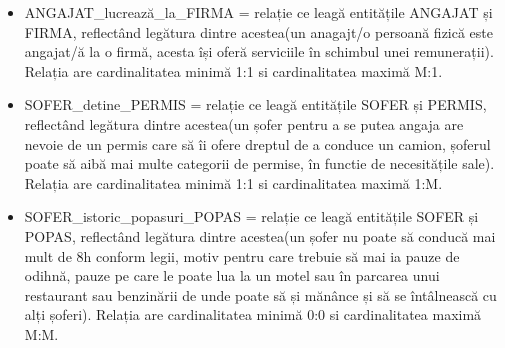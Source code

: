 \documentclass[12pt, a4paper]{article}
\begin{document}
\begin{itemize}
    \item ANGAJAT\_lucrează\_la\_FIRMA = relație ce leagă entitățile ANGAJAT și FIRMA, reflectând legătura dintre acestea(un anagajt/o persoană fizică este angajat/ă la o firmă, acesta își oferă serviciile în schimbul unei remunerații). Relația are cardinalitatea minimă 1:1 si cardinalitatea maximă M:1.
    \item SOFER\_detine\_PERMIS = relație ce leagă entitățile SOFER și PERMIS, reflectând legătura dintre acestea(un șofer pentru a se putea angaja are nevoie de un permis care să îi ofere dreptul de a conduce un camion, șoferul poate să aibă mai multe categorii de permise, în functie de necesitățile sale). Relația are cardinalitatea minimă 1:1 si cardinalitatea maximă 1:M.
    \item SOFER\_istoric\_popasuri\_POPAS = relație ce leagă entitățile SOFER și POPAS, reflectând legătura dintre acestea(un șofer nu poate să conducă mai mult de 8h conform legii, motiv pentru care trebuie să mai ia pauze de odihnă, pauze pe care le poate lua la un motel sau în parcarea unui restaurant sau benzinării de unde poate să și mănânce și să se întâlnească cu alți șoferi). Relația are cardinalitatea minimă 0:0 si cardinalitatea maximă M:M.

\end{itemize}
\end{document}
